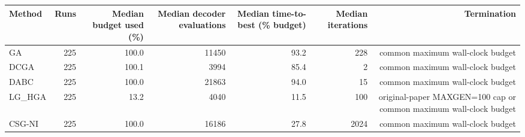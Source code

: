 \begin{tabular}{lrrrrrr}
\toprule
Method & Runs & Median budget used (\%) & Median decoder evaluations & Median time-to-best (\% budget) & Median iterations & Termination \\
\midrule
GA & 225 & 100.0 & 11450 & 93.2 & 228 & common maximum wall-clock budget \\
DCGA & 225 & 100.1 & 3994 & 85.4 & 2 & common maximum wall-clock budget \\
DABC & 225 & 100.0 & 21863 & 94.0 & 15 & common maximum wall-clock budget \\
LG\_HGA & 225 & 13.2 & 4040 & 11.5 & 100 & original-paper MAXGEN=100 cap or common maximum wall-clock budget \\
CSG-NI & 225 & 100.0 & 16186 & 27.8 & 2024 & common maximum wall-clock budget \\
\bottomrule
\end{tabular}
